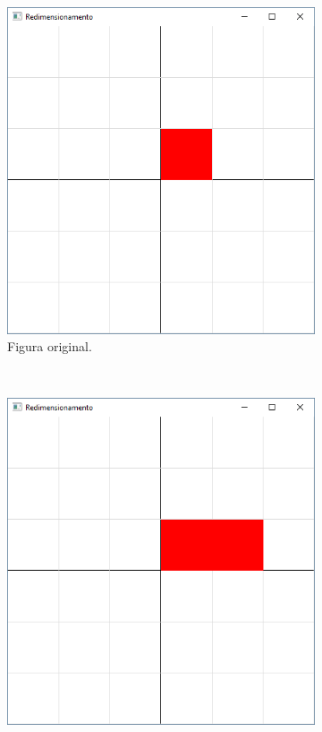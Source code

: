 \begin{figure}[H]
  \centering
  \begin{subfigure}[t]{.25\textwidth}
    \includegraphics[width=.9\textwidth]{img/linear3a}
    \caption{Figura original.} 
  \end{subfigure}
  ~
  \begin{subfigure}[t]{.25\textwidth}
    \includegraphics[width=.9\textwidth]{img/linear3b}

\end{subfigure}
\end{figure}
